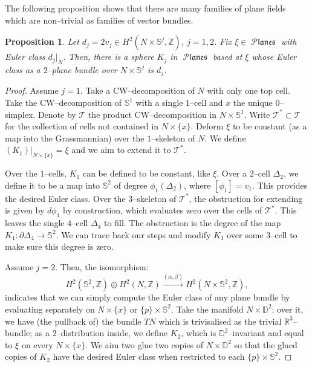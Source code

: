 \documentclass[10pt]{amsart}
\newcommand{\Planes}{\operatorname{\mathcal{P}\mathfrak{lanes}}}
\newcommand{\ST}{{\mathcal{T}}}
\newcommand{\R}{{\mathbb{R}}}
\newcommand{\Z}{{\mathbb{Z}}}
\newcommand{\NS}{{\mathbb{S}}}
\newcommand{\D}{{\mathbb{D}}}
\newtheorem{proposition}{Proposition}
\theoremstyle{definition}
\begin{document}
The following proposition shows that there are many families of plane fields which are non--trivial as families of vector bundles.

\begin{proposition} \label{prop:planeEulerClass}
Let $d_j =2v_j \in H^2(N \times \NS^j, \Z)$, $j=1,2$. Fix $\xi \in \Planes$ with Euler class $d_j|_N$. Then, there is a sphere $K_j$ in $\Planes$ based at $\xi$ whose Euler class as a $2$--plane bundle over $N \times \NS^j$ is $d_j$.
\end{proposition}
\begin{proof}
Assume $j=1$. Take a CW--decomposition of $N$ with only one top cell. Take the CW--decomposition of $\NS^1$ with a single $1$--cell and $x$ the unique $0$--simplex. Denote by $\ST$ the product CW--decomposition in $N \times \NS^1$. Write $\ST^* \subset \ST$ for the collection of cells not contained in $N \times \{x\}$. Deform $\xi$ to be constant (as a map into the Grassmannian) over the $1$--skeleton of $N$. We define $(K_1)|_{N \times \{x\}} = \xi$ and we aim to extend it to $\ST^*$. 

Over the $1$--cells, $K_1$ can be defined to be constant, like $\xi$. Over a $2$--cell $\Delta_2$, we define it to be a map into $\NS^2$ of degree $\phi_1(\Delta_2)$, where $[\phi_1] = v_1$. This provides the desired Euler class. Over the $3$--skeleton of $\ST^*$, the obstruction for extending is given by $d\phi_1$ by construction, which evaluates zero over the cells of $\ST^*$. This leaves the single $4$--cell $\Delta_4$ to fill. The obstruction is the degree of the map $K_1: \partial \Delta_4 \to \NS^2$. We can trace back our steps and modify $K_1$ over some $3$--cell to make sure this degree is zero.

Assume $j=2$. Then, the isomorphism:
\[ H^2(\NS^2,\Z) \oplus H^2(N,\Z) \overset{(\alpha,\beta)}\longrightarrow H^2(N \times \NS^2, \Z), \]
indicates that we can simply compute the Euler class of any plane bundle by evaluating separately on $N \times \{x\}$ or $\{p\} \times \NS^2$. Take the manifold $N \times \D^2$: over it, we have (the pullback of) the bundle $TN$ which is trivisalised as the trivial $\R^3$--bundle; as a 2--distribution inside, we define $K_2$, which is $\D^2$--invariant and equal to $\xi$ on every $N \times \{x\}$. We aim two glue two copies of $N \times \D^2$ so that the glued copies of $K_2$ have the desired Euler class when restricted to each $\{p\} \times \NS^2$.


\end{proof}
\end{document}
